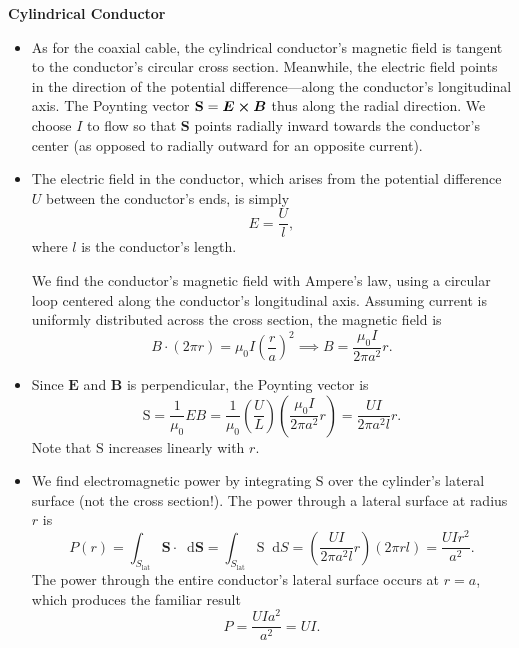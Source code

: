\documentclass[11pt, a4paper]{article}
\newcommand{\diff}{\mathop{}\!\mathrm{d}} %
\renewcommand{\vec}[1]{\bm{#1}} %
\newcommand{\E}{\vec{E}}  %
\newcommand{\B}{\vec{B}}  %
\renewcommand{\S}{\mathbf{S}}  %
\renewcommand{\SS}{\mathrm{S}}  %
\newcommand{\mm}{\mu_{0}}  %
\newcommand{\m}{\vec{m}}  %
\newcommand{\Poy}{Poynting\xspace}
\begin{document}
\textbf{Cylindrical Conductor}
\begin{itemize}
	\item As for the coaxial cable, the cylindrical conductor's magnetic field is tangent to the conductor's circular cross section. Meanwhile, the electric field points in the direction of the potential difference---along the conductor's longitudinal axis. The \Poy vector $ \S = \E \cross \B $ thus along the radial direction. We choose $ I $ to flow so that $ \S $ points radially inward towards the conductor's center (as opposed to radially outward for an opposite current).
	
	\item The electric field in the conductor, which arises from the potential difference $ U $ between the conductor's ends, is simply
	\begin{equation*}
		E = \frac{U}{l},
	\end{equation*}
	where $ l $ is the conductor's length.
	
	We find the conductor's magnetic field with Ampere's law, using a circular loop centered along the conductor's longitudinal axis. Assuming current is uniformly distributed across the cross section, the magnetic field is
	\begin{equation*}
		B \cdot (2\pi r) = \mm I \left(\frac{r}{a}\right)^{2} \implies B =  \frac{\mm I}{2\pi a^{2}}r.
	\end{equation*}
	
	\item Since $ \E $ and $ \B $ is perpendicular, the \Poy vector is
	\begin{equation*}
		\SS = \frac{1}{\mm}E B = \frac{1}{\mm} \left(\frac{U}{L}\right)\left( \frac{\mm I}{2\pi a^{2}}r\right) = \frac{UI}{2\pi a^{2}l}r.
	\end{equation*}
	Note that $ \SS $ increases linearly with $ r $. 
	
	\item We find electromagnetic power by integrating $ \SS $ over the cylinder's lateral surface (not the cross section!). The power through a lateral surface at radius $ r $ is
	\begin{equation*}
		P(r) = \int_{S_{\text{lat}}} \S \cdot \diff \vec{S} = \int_{S_{\text{lat}}} \SS \diff S =  \left(\frac{UI}{2\pi a^{2}l}r\right) (2\pi r l) = \frac{UIr^{2}}{a^{2}}.
	\end{equation*}
	The power through the entire conductor's lateral surface occurs at $ r = a $, which produces the familiar result
	\begin{equation*}
		P = \frac{UIa^{2}}{a^{2}} = UI.
	\end{equation*}
	

\end{itemize}
\end{document}
